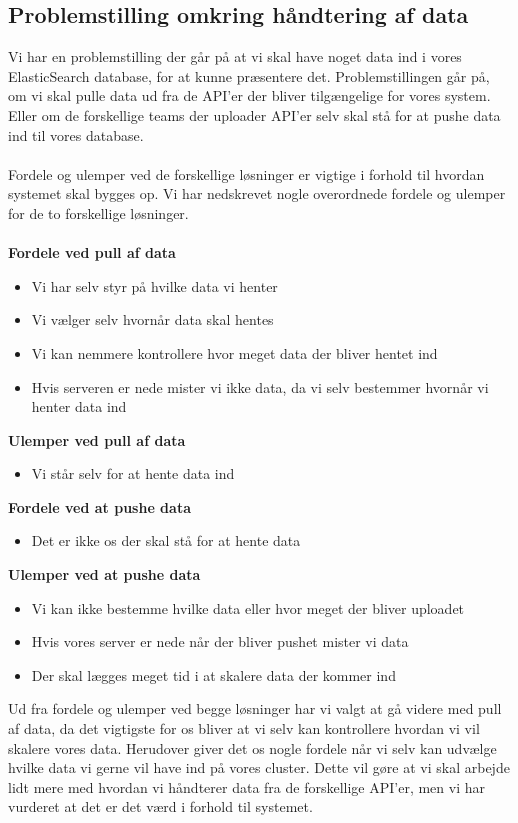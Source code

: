 \subsection{Problemstilling omkring håndtering af data}
Vi har en problemstilling der går på at vi skal have noget data ind i vores ElasticSearch database, for at kunne præsentere det.
Problemstillingen går på, om vi skal pulle data ud fra de API'er der bliver tilgængelige for vores system. Eller om de forskellige teams der uploader API'er selv skal stå for at pushe data ind til vores database.
\\\\
Fordele og ulemper ved de forskellige løsninger er vigtige i forhold til hvordan systemet skal bygges op.
Vi har nedskrevet nogle overordnede fordele og ulemper for de to forskellige løsninger.
\\\\
\textbf{Fordele ved pull af data}
\begin{itemize}
    \item{Vi har selv styr på hvilke data vi henter}
    \item{Vi vælger selv hvornår data skal hentes}
    \item{Vi kan nemmere kontrollere hvor meget data der bliver hentet ind}
    \item{Hvis serveren er nede mister vi ikke data, da vi selv bestemmer hvornår vi henter data ind}
\end{itemize}
\textbf{Ulemper ved pull af data}
\begin{itemize}
    \item{Vi står selv for at hente data ind}
\end{itemize}
\textbf{Fordele ved at pushe data}
\begin{itemize}
    \item{Det er ikke os der skal stå for at hente data}
\end{itemize}
\textbf{Ulemper ved at pushe data}
\begin{itemize}
    \item{Vi kan ikke bestemme hvilke data eller hvor meget der bliver uploadet}
    \item{Hvis vores server er nede når der bliver pushet mister vi data}
    \item{Der skal lægges meget tid i at skalere data der kommer ind}
\end{itemize}
Ud fra fordele og ulemper ved begge løsninger har vi valgt at gå videre med pull af data, da det vigtigste for os bliver at vi selv kan kontrollere hvordan vi vil skalere vores data. Herudover giver det os nogle fordele når vi selv kan udvælge hvilke data vi gerne vil have ind på vores cluster. Dette vil gøre at vi skal arbejde lidt mere med hvordan vi håndterer data fra de forskellige API'er, men vi har vurderet at det er det værd i forhold til systemet.
